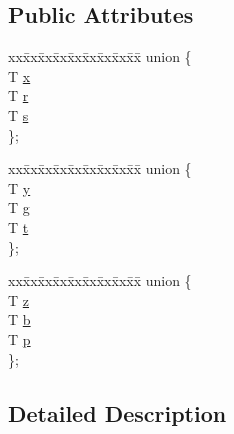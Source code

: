 \subsection*{Public Attributes}
\begin{DoxyCompactItemize}
\item 
\begin{tabbing}
xx\=xx\=xx\=xx\=xx\=xx\=xx\=xx\=xx\=\kill
union \{\\
\>T \mbox{\hyperlink{structglm_1_1tvec3_a84f2c27604bd6ab7f256e3912fb8a79d}{x}}\\
\>T \mbox{\hyperlink{structglm_1_1tvec3_ac558022923dfc3f952f5946532c1f4b0}{r}}\\
\>T \mbox{\hyperlink{structglm_1_1tvec3_ac350e1f6f735cfd76cd2d44c779ebca2}{s}}\\
\}; \\

\end{tabbing}\item 
\begin{tabbing}
xx\=xx\=xx\=xx\=xx\=xx\=xx\=xx\=xx\=\kill
union \{\\
\>T \mbox{\hyperlink{structglm_1_1tvec3_a3969b512749f01b1afd7d60f32f50c94}{y}}\\
\>T \mbox{\hyperlink{structglm_1_1tvec3_a1ed9dc6682a6d36221feb544337e60e3}{g}}\\
\>T \mbox{\hyperlink{structglm_1_1tvec3_a0a83cdfc088a60414654fd56b9b70762}{t}}\\
\}; \\

\end{tabbing}\item 
\begin{tabbing}
xx\=xx\=xx\=xx\=xx\=xx\=xx\=xx\=xx\=\kill
union \{\\
\>T \mbox{\hyperlink{structglm_1_1tvec3_aa105b56701c38430e9ac732d4f41925a}{z}}\\
\>T \mbox{\hyperlink{structglm_1_1tvec3_a570fe745d201dd6f0e700c36e3f18a77}{b}}\\
\>T \mbox{\hyperlink{structglm_1_1tvec3_a417136ea49cbecf1d92697b283e1a25f}{p}}\\
\}; \\

\end{tabbing}\end{DoxyCompactItemize}


\subsection{Detailed Description}
